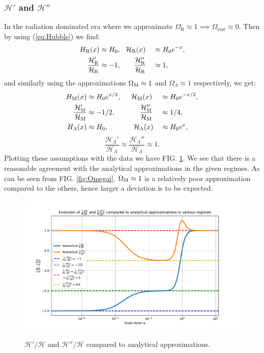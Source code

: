 \documentclass[%
reprint,
 amsmath,amssymb,
 aps,
]{revtex4-2}
\newcommand{\Hp}{\mathcal{H}}
\begin{document}
\subsubsection{$\Hp'$ and $\Hp''$}
In the radiation dominated era where we approximate $\Omega_{\text{R}}\approx1\implies\Omega_\text{rest}\approx0$. Then by using (\ref{eq:Hubble}) we find:
\begin{alignat*}{2}
	H_{\text{R}}(x)&\approx H_0,~~\Hp_{\text{R}}(x)&&\approx H_0e^{-x},\\
	\frac{\Hp_{\text{R}}'}{\Hp_{\text{R}}}&\approx-1,\hspace{6.5mm}\frac{\Hp_{\text{R}}''}{\Hp_{\text{R}}}&&\approx1,
\end{alignat*}
and similarly using the approximations $\Omega_{\text M}\approx1$ and $\Omega_\Lambda\approx1$ respectively, we get:
\begin{alignat*}{2}
	H_\text{M}(x)&\approx H_0e^{x/2},\hspace{5mm}\Hp_\text M(x)&&\approx H_0e^{-x/2},\\
	\frac{\Hp_\text M'}{\Hp_\text M}&\approx-1/2,\hspace{12mm}\frac{\Hp_\text M''}{\Hp_\text M}&&\approx1/4,\\
	H_\Lambda(x)&\approx H_0,\hspace{12.5mm}\Hp_\Lambda(x)&&\approx H_0e^{x},
\end{alignat*}
\vspace{-7.2mm}
\[\frac{\Hp_\Lambda'}{\Hp_\Lambda}\approx\frac{\Hp_\Lambda''}{\Hp_\Lambda}\approx1.\]
Plotting these assumptions with the data we have FIG. \ref{fig:dHpddHp_vs_anal}. We see that there is a reasonable agreement with the analytical approximations in the given regimes. As can be seen from FIG. \ref{fig:Omegai}, $\Omega_{\text M}\approx1$ is a relatively poor approximation compared to the others, hence larger a deviation is to be expected.
\begin{figure}[ht!]
	\caption{$\Hp'/\Hp$ and $\Hp''/\Hp$ compared to analytical approximations.}
	\includegraphics[width = \linewidth]{Figures/dHpddHp_vs_anal.pdf}
	\label{fig:dHpddHp_vs_anal}
\end{figure}
\end{document}
